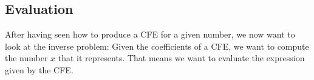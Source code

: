 













\subsection{Evaluation}
After having seen how to produce a CFE for a given number, we now want to look at the inverse problem: Given the coefficients of a CFE, we want to compute the number $x$ that it represents. That means we want to evaluate the expression given by the CFE.

